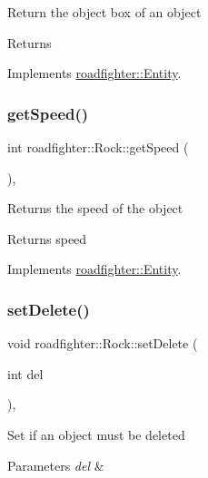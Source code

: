 Return the object box of an object \begin{DoxyReturn}{Returns}

\end{DoxyReturn}


Implements \hyperlink{classroadfighter_1_1Entity_af14340d04a725175a6d221f23c35fa0c}{roadfighter\+::\+Entity}.

\mbox{\label{classroadfighter_1_1Rock_ab3f596c927c49ab4b159391dc7287192}} 
\subsubsection{\texorpdfstring{get\+Speed()}{getSpeed()}}
{\footnotesize\ttfamily int roadfighter\+::\+Rock\+::get\+Speed (\begin{DoxyParamCaption}{ }\end{DoxyParamCaption})\hspace{0.3cm}{\ttfamily [override]}, {\ttfamily [virtual]}}

Returns the speed of the object \begin{DoxyReturn}{Returns}
speed 
\end{DoxyReturn}


Implements \hyperlink{classroadfighter_1_1Entity_ad3760184d764a61922e1db7d98501ee4}{roadfighter\+::\+Entity}.

\mbox{\label{classroadfighter_1_1Rock_ae2cef1d49610edd8b0438b6c84fdabfd}} 
\subsubsection{\texorpdfstring{set\+Delete()}{setDelete()}}
{\footnotesize\ttfamily void roadfighter\+::\+Rock\+::set\+Delete (\begin{DoxyParamCaption}\item[{int}]{del }\end{DoxyParamCaption})\hspace{0.3cm}{\ttfamily [override]}, {\ttfamily [virtual]}}

Set if an object must be deleted 
\begin{DoxyParams}{Parameters}
{\em del} & \\
\hline
\end{DoxyParams}


